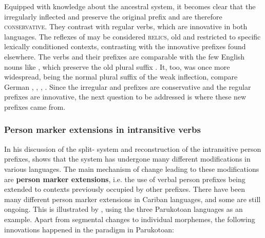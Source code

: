 Equipped with knowledge about the ancestral system, it becomes clear that the irregularly inflected \hixka and \trio  preserve the original \PC {} prefix  and are therefore \textsc{conservative}.
They contrast with regular  verbs, which are innovative in both languages.
The reflexes of  may be considered \textsc{relics}, old and restricted to specific lexically conditioned contexts, contrasting with the innovative prefixes found elsewhere.
The verbs and their prefixes are comparable with the few English nouns like , which preserve the old plural suffix .
It, too, was once more widespread, being the normal plural suffix of the weak inflection, compare German  ,  ,  ,  .
Since the irregular \hixka and \trio prefixes are conservative and the regular prefixes are innovative, the next question to be addressed is where these new prefixes came from.


%

\subsubsection{Person marker extensions in intransitive verbs}
\label{sec:extensions_intro}
In his discussion of the \PC split- system and reconstruction of the intransitive person prefixes, \textcite[88--96]{gildea1998} shows that the system has undergone many different modifications in various languages.
The main mechanism of change leading to these modifications are \textbf{person marker extensions}, i.e. the use of verbal person prefixes being extended to contexts previously occupied by other prefixes.
There have been many different person marker extensions in Cariban languages, and some are still ongoing.
This is illustrated by \textcite{gildea1998}, using the three Parukotoan languages as an example.
Apart from segmental changes to individual morphemes, the following innovations happened in the \setone paradigm in Parukotoan:


